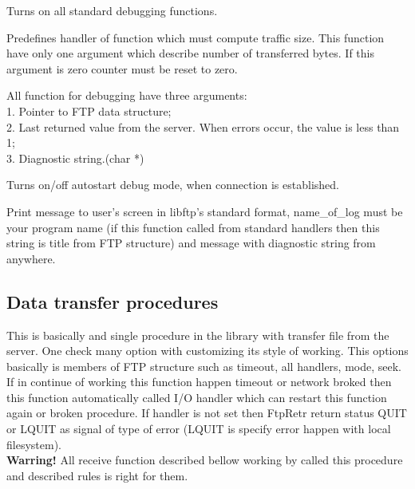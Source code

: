 {
Turns on all standard debugging functions. 

}

{
   Predefines handler of function which must compute traffic size. This 
function have only one argument which describe number of transferred bytes.
If this argument is zero counter must be reset to zero.
}


All function for debugging have three arguments:\\
1. Pointer to FTP data structure;\\
2. Last returned value from the server. When errors occur, the value is less than 1;\\
3. Diagnostic string.(char *)

{	Turns on/off autostart debug mode, when connection is established.
}

{	Print message to user's screen in libftp's standard format,
        name\_of\_log must be your program name (if this function called 
from standard handlers then this string is title from FTP structure) and 
message with diagnostic string from anywhere.} 


\subsection{Data transfer procedures}

{
	This is basically and single procedure in the library with transfer
	file from the server. One check many option with customizing its style
	of working. This options basically is members of FTP structure such
	as timeout, all handlers, mode, seek. If in continue of working this
	function happen timeout or network broked then this function 
	automatically called I/O handler which can restart this function
	again or broken procedure. If handler is not set then FtpRetr return
	status QUIT or LQUIT as signal of type of error (LQUIT is specify
	error happen with local filesystem). \\
	{\bf Warring!} All receive function described bellow working by 
	called this procedure and described rules is right for them.
}

